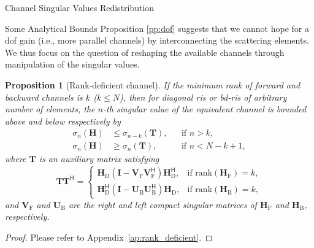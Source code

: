 \documentclass[journal]{IEEEtran}
\newtheorem{proposition}{Proposition}
\begin{document}
\begin{section}{Channel Singular Values Redistribution}
\begin{subsection}{Some Analytical Bounds}
		Proposition \ref{pp:dof} suggests that we cannot hope for a \gls{dof} gain (i.e., more parallel channels) by interconnecting the scattering elements.
		We thus focus on the question of reshaping the available channels through manipulation of the singular values.


		\begin{proposition}[Rank-deficient channel]\label{pp:rank_deficient}
			If the minimum rank of forward and backward channels is $k$ ($k \le N$),
			then for diagonal \gls{ris} or \gls{bd}-\gls{ris} of arbitrary number of elements, the $n$-th singular value of the equivalent channel is bounded above and below respectively by
			\begin{subequations}
				\begin{align}
					\sigma_n(\mathbf{H}) & \le \sigma_{n-k}(\mathbf{T}), &  & \text{if } n > k, \label{iq:sv_bound_enlarge}          \\
					\sigma_n(\mathbf{H}) & \ge \sigma_n(\mathbf{T}),     &  & \text{if } n < N - k + 1, \label{iq:sv_bound_suppress}
				\end{align}
				\label{iq:sv_bound_rank_deficient}
			\end{subequations}
			where $\mathbf{T}$ is an auxiliary matrix satisfying
			\begin{equation}
				\mathbf{T} \mathbf{T}^\mathsf{H} =
				\begin{cases}
					\mathbf{H}_\mathrm{D} (\mathbf{I} - \mathbf{V}_\mathrm{F} \mathbf{V}_\mathrm{F}^\mathsf{H}) \mathbf{H}_\mathrm{D}^\mathsf{H}, & \text{if } \mathrm{rank}(\mathbf{H}_\mathrm{F}) = k, \\
					\mathbf{H}_\mathrm{D}^\mathsf{H} (\mathbf{I} - \mathbf{U}_\mathrm{B} \mathbf{U}_\mathrm{B}^\mathsf{H}) \mathbf{H}_\mathrm{D}, & \text{if } \mathrm{rank}(\mathbf{H}_\mathrm{B}) = k,
				\end{cases}
				\label{eq:auxiliary_matrix}
			\end{equation}
			and $\mathbf{V}_\mathrm{F}$ and $\mathbf{U}_\mathrm{B}$ are the right and left compact singular matrices of $\mathbf{H}_\mathrm{F}$ and $\mathbf{H}_\mathrm{B}$, respectively.
		\end{proposition}
		\begin{proof}
			Please refer to Appendix~\ref{ap:rank_deficient}.
		\end{proof}


\end{subsection}
\end{section}
\end{document}
